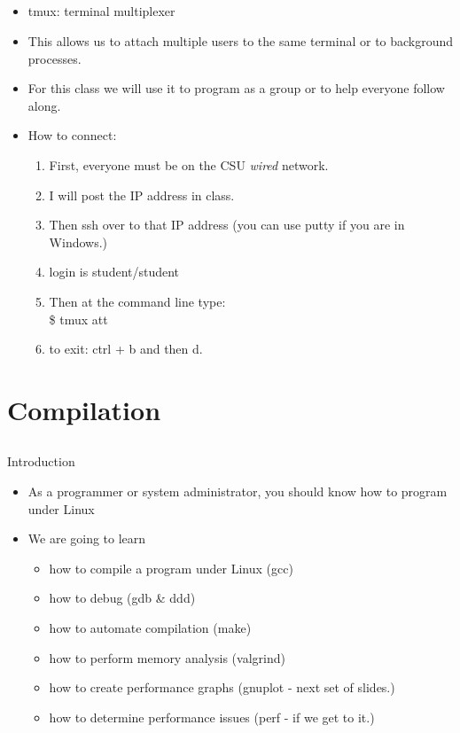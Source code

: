 \documentclass{beamer}
\begin{document}
\subsection{}
\begin{frame}
\begin{itemize}
\item tmux: terminal multiplexer
\item This allows us to attach multiple users to the same terminal or to background processes.
\item For this class we will use it to program as a group or to help everyone follow along.
\item How to connect:
\begin{enumerate}
\item First, everyone must be on the CSU \textit{wired} network.
\item I will post the IP address in class.
\item Then ssh over to that IP address (you can use putty if you are in Windows.)
\item login is student/student
\item Then at the command line type: \\
\$ tmux att
\item to exit: ctrl + b and then d.
\end{enumerate}
\end{itemize}
\end{frame}

\section{Compilation}
\subsection{}
\begin{frame}{Introduction}
\begin{itemize}
\item As a programmer or system administrator, you should know how to program under Linux
\item We are going to learn 
\begin{itemize}
\item how to compile a program under Linux (gcc)
\item how to debug (gdb \& ddd)
\item how to automate compilation (make)
\item how to perform memory analysis (valgrind)
\item how to create performance graphs (gnuplot - next set of slides.)
\item how to determine performance issues (perf - if we get to it.)
\end{itemize}
\end{itemize}
\end{frame}
\end{document}
